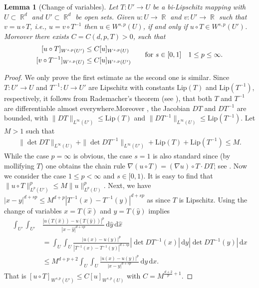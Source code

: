 \documentclass[12pt, reqno]{amsart}%
\theoremstyle{plain}  %
\newtheorem{lemma}[theorem]{Lemma}
\theoremstyle{definition}  %
\theoremstyle{remark}
\numberwithin{equation}{section}
\DeclareMathOperator{\R}{\mathbb{R}}
\renewcommand{\d}{\,\mathrm{d}}
\begin{document}
\begin{lemma}[Change of variables]\label{lem:change-variables}
Let $T : U'\to U$ be a bi-Lipschitz mapping  with  $U\subset \R^d$ and $U' \subset \R^d$ be open sets. Given $u:U\to \R$ and $v:U'\to \R$ such that $v= u\circ  T$, i.e., $u= v\circ T^{-1}$ then $u \in W^{s,p}(U)$, if and only if $u\circ T\in W^{s,p}(U')$.  Moreover there exists  $C = C(d,p,T)> 0$, such that
\begin{align*}
\begin{split}
[u\circ T]_{W^{s,p}(U')}&\leq C[u]_{W^{s,p}(U)}\\
[v\circ T^{-1}]_{W^{s,p}(U)}&\leq C[u]_{W^{s,p}(U')}
\end{split}\quad\quad\text{for $s\in [0,1]$ \,\, $1\leq p\leq \infty$}.
\end{align*}
\end{lemma}

\begin{proof}
We only prove the first estimate as the second one is similar. Since $T : U' \to U$ and $T^{-1} : U \to U'$ are Lipschitz with constants $\mathrm{Lip}(T)$ and $\mathrm{Lip}(T^{-1})$, respectively, it follows from Rademacher's theorem (see \cite{Hei05}), that both $T$ and $T^{-1}$ are differentiable almost everywhere.Moreover , the Jacobian $DT$ and $DT^{-1}$ are bounded, with $\|DT\|_{L^\infty(U')} \leq \mathrm{Lip}(T)$ and $
\|DT^{-1}\|_{L^\infty(U)} \leq \mathrm{Lip}(T^{-1})
$. Let $M>1$ such that
\begin{align*}
\|\det D T\|_{L^\infty(U)}+ \|\det D T^{-1}\|_{L^\infty(U')}+ \mathrm{Lip}(T)+\mathrm{Lip}(T^{-1})\leq M.
\end{align*}
While the case $p=\infty$ is obvious, the case $s=1$ is also standard since (by mollifying $T$) one obtains the chain rule $\nabla (u\circ T)= (\nabla u)\circ T\cdot D T$; see  \cite[Theorem III.2.13.]{BF13}. Now we consider the case $1\leq p<\infty$ and $s\in [0,1)$. It is easy to find that
$\|u\circ T\|^p_{L^p(U')}
\leq M\|u\|^p_{L^p(U)}$.  Next,  we have $|x-y|^{d+sp}\leq M^{d+p}|T^{-1}(x)-T^{-1} (y)|^{d+sp}$ as since $T$ is Lipschitz.
Using the change of variables $x=T(\hat{x})$  and $y=T(\hat{y})$ implies
\begin{align*}
\int_{U'}\int_{U'}& \frac{|u(T(\hat{x}))-u(T(\hat{y}))|^p}{|\hat{x}-\hat{y}|^{d+sp}} \d\hat{y} \d\hat{x}  \\
 & = \int_{U}\int_{U} \frac{|u(x)-u(y)|^p}{|T^{-1}(x)-T^{-1}(y)|^{d+sp}}|\det DT^{-1}(x)| \d y |\det DT^{-1}(y)| \d x \\
 &  \leq M^{d+p+2} \int_{U}\int_{U} \frac{|u(x)-u(y)|^p}{|x-y|^{d+sp}}\d y \d x.
\end{align*}
That is $[u\circ T]_{W^{s,p}(U') } \leq C [u]_{W^{s,p}(U)} $ with $C=M^{\frac{d+2}{p}+1}$.
\end{proof}
\end{document}
